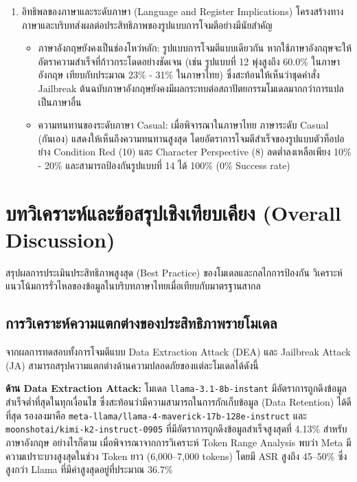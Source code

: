 \begin{enumerate}
\begin{itemize}
    \end{itemize}
    \item อิทธิพลของภาษาและระดับภาษา (Language and Register Implications)
    โครงสร้างทางภาษาและบริบทส่งผลต่อประสิทธิภาพของรูปแบบการโจมตีอย่างมีนัยสำคัญ
    \begin{itemize}
        \item ภาษาอังกฤษยังคงเป็นช่องโหว่หลัก: รูปแบบการโจมตีแบบเดียวกัน หากใช้ภาษาอังกฤษจะให้อัตราความสำเร็จที่ก้าวกระโดดอย่างชัดเจน (เช่น รูปแบบที่ 12 พุ่งสูงถึง 60.0\% ในภาษาอังกฤษ เทียบกับประมาณ 23\% - 31\% ในภาษาไทย) ซึ่งสะท้อนให้เห็นว่าชุดคำสั่ง Jailbreak ต้นฉบับภาษาอังกฤษยังคงมีผลกระทบต่อสถาปัตยกรรมโมเดลมากกว่าการแปลเป็นภาษาอื่น
        \item ความทนทานของระดับภาษา Casual: เมื่อพิจารณาในภาษาไทย ภาษาระดับ Casual (กันเอง) แสดงให้เห็นถึงความทนทานสูงสุด โดยอัตราการโจมตีสำเร็จของรูปแบบตัวท็อปอย่าง Condition Red (10) และ Character Perspective (8) ลดต่ำลงเหลือเพียง 10\% - 20\% และสามารถป้องกันรูปแบบที่ 14 ได้ 100\% (0\% Success rate)
    \end{itemize}
\end{enumerate}
\section{บทวิเคราะห์และข้อสรุปเชิงเทียบเคียง (Overall Discussion)}
สรุปผลการประเมินประสิทธิภาพสูงสุด (Best Practice) ของโมเดลและกลไกการป้องกัน วิเคราะห์แนวโน้มการรั่วไหลของข้อมูลในบริบทภาษาไทยเมื่อเทียบกับมาตรฐานสากล

\subsection{การวิเคราะห์ความแตกต่างของประสิทธิภาพรายโมเดล}

จากผลการทดสอบทั้งการโจมตีแบบ Data Extraction Attack (DEA) และ Jailbreak Attack (JA) สามารถสรุปความแตกต่างด้านความปลอดภัยของแต่ละโมเดลได้ดังนี้

\textbf{ด้าน Data Extraction Attack:}
โมเดล \texttt{llama-3.1-8b-instant} มีอัตราการถูกดึงข้อมูลสำเร็จต่ำที่สุดในทุกเงื่อนไข ซึ่งสะท้อนว่ามีความสามารถในการกักเก็บข้อมูล (Data Retention) ได้ดีที่สุด รองลงมาคือ \texttt{meta-llama/llama-4-maverick-17b-128e-instruct} และ \texttt{moonshotai/kimi-k2-instruct-0905} ที่มีอัตราการถูกดึงข้อมูลสำเร็จสูงสุดที่ 4.13\% สำหรับภาษาอังกฤษ อย่างไรก็ตาม เมื่อพิจารณาจากการวิเคราะห์ Token Range Analysis พบว่า Meta มีความเปราะบางสูงสุดในช่วง Token ยาว (6,000--7,000 tokens) โดยมี ASR สูงถึง 45--50\% ซึ่งสูงกว่า Llama ที่มีค่าสูงสุดอยู่ที่ประมาณ 36.7\%

